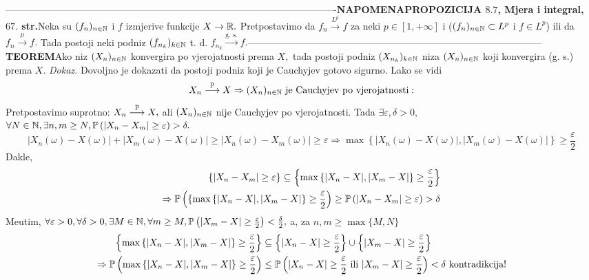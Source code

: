 \documentclass{article}
\begin{document}
-------------------------------------------------------------------------------------------------------\newline\newline{}\textbf{NAPOMENA}\newline \textbf{PROPOZICIJA \(8.7\), Mjera i integral, \(67.\) str.}\newline Neka su \((f_n)_{n\in\Bbb N}\) i \(f\) izmjerive funkcije \(X\to\Bbb R.\) Pretpostavimo da \(f_n\overset{L^p}{\longrightarrow}f\) za neki \(p\in[1,+\infty]\) i (\((f_n)_{n\in\Bbb N}\subset L^p\) i \(f\in L^p\)) ili da \(f_n\overset{\mu}{\longrightarrow}f.\) Tada postoji neki podniz \((f_{n_k})_{k\in\Bbb N}\) t. d. \(f_{n_k}\overset{\text{g. s.}}{\longrightarrow}f.\)\newline\newline--------------------------------------------------------------------------------------------\newline\newline
\textbf{TEOREM}\newline Ako niz \((X_n)_{n\in\Bbb N}\) konvergira po vjerojatnosti prema \(X,\) tada postoji podniz \((X_{n_k})_{k\in\Bbb N}\) niza \((X_n)_{n\in\Bbb N}\) koji konvergira (g. s.) prema \(X.\)\newline\newline
\textit{Dokaz.}\newline 
Dovoljno je dokazati da postoji podniz koji je Cauchyjev gotovo sigurno. Lako se vidi \[X_n\overset{\Bbb P}{\longrightarrow}X\Rightarrow (X_n)_{n\in\Bbb N}\text{ je Cauchyjev po vjerojatnosti}:\] Pretpostavimo suprotno: \(X_n\overset{\Bbb P}{\longrightarrow}X,\) ali \((X_n)_{n\in\Bbb N}\) nije Cauchyjev po vjerojatnosti. Tada \(\exists\varepsilon,\delta>0,\)\newline\(\forall N\in\Bbb N,\exists n,m\ge N, \Bbb P\left(|X_n-X_m|\ge\varepsilon\right)>\delta.\) \[|X_n(\omega)-X(\omega)|+|X_m(\omega)-X(\omega)|\ge|X_n(\omega)-X_m(\omega)|\ge\varepsilon\Rightarrow\max\left\{|X_n(\omega)-X(\omega)|,|X_m(\omega)-X(\omega)|\right\}\ge\frac\varepsilon2\] Dakle, \[\begin{aligned}\left\{|X_n-X_m|\ge\varepsilon\right\}\subseteq\left\{\max\left\{|X_n-X|,|X_m-X|\right\}\ge\frac\varepsilon2\right\}\\\Rightarrow\Bbb P\left(\{\max\left\{|X_n-X|,|X_m-X|\right\}\ge\frac\varepsilon2\right)\ge\Bbb P\left(|X_n-X_m|\ge\varepsilon\right)>\delta\end{aligned}\] Me\dj{}utim, \(\forall \varepsilon>0,\forall\delta>0,\exists M\in\Bbb N,\forall m\ge M,\Bbb P\left(|X_m-X|\ge\frac\varepsilon2\right)<\frac\delta2,\) a, za \(n,m\ge\max\{M,N\}\) \[\begin{aligned}\left\{\max\left\{|X_n-X|,|X_m-X|\right\}\ge\frac\varepsilon2\right\}&\subseteq\left\{|X_n-X|\ge\frac\varepsilon2\right\}\cup\left\{|X_m-X|\ge\frac\varepsilon2\right\}\\\Rightarrow\Bbb P\left(\max\left\{|X_n-X|,|X_m-X|\right\}\ge\frac\varepsilon2\right)&\le\Bbb P\left(|X_n-X|\ge\frac\varepsilon2\text{ ili }|X_m-X|\ge\frac\varepsilon2\right)<\delta\text{ kontradikcija!}\end{aligned}\]
\end{document}
